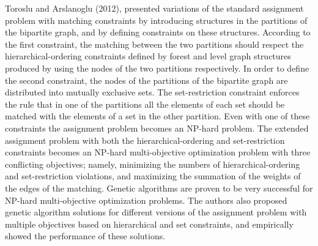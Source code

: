 \documentclass[11pt]{report}
\newcommand{\NI}{\noindent}
\begin{document}
	\NI Toroslu and Arslanoglu (2012), presented variations of the standard assignment problem with matching constraints by introducing structures in the partitions of the bipartite graph, and by defining constraints on these structures. According to the first constraint, the matching between
	the two partitions should respect the hierarchical-ordering constraints defined by forest and level graph structures produced by using the nodes of the two partitions respectively. In order to define the second constraint, the nodes of the partitions of the bipartite graph are distributed into mutually exclusive sets. The set-restriction constraint enforces the rule that in one of the partitions all the elements of each set should be matched with the elements of a set in the other partition. Even with one of these constraints the assignment problem becomes an NP-hard problem. The extended assignment problem with both the hierarchical-ordering and set-restriction constraints becomes an NP-hard multi-objective optimization problem with three conflicting objectives; namely, minimizing the numbers of hierarchical-ordering and set-restriction violations, and maximizing the summation of the weights of the edges of the matching. Genetic algorithms are proven to be very successful for NP-hard multi-objective optimization problems. The authors also proposed genetic algorithm solutions for different versions of the assignment problem with multiple objectives based on hierarchical and set constraints, and empirically showed the performance of these solutions.\\
	
\end{document}
